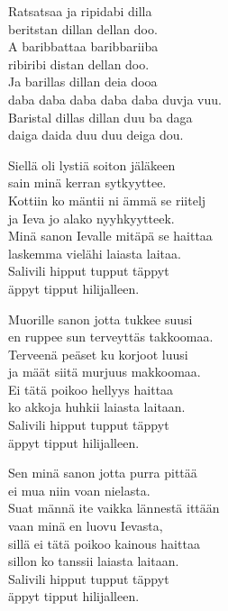Ratsatsaa ja ripidabi dilla\\
beritstan dillan dellan doo.\\
A baribbattaa baribbariiba\\
ribiribi distan dellan doo.\\
Ja barillas dillan deia dooa\\
daba daba daba daba daba duvja vuu.\\
Baristal dillas dillan duu ba daga\\
daiga daida duu duu deiga dou.


Siellä oli lystiä soiton jäläkeen\\
sain minä kerran sytkyyttee.\\
Kottiin ko mäntii ni ämmä se riitelj\\
ja Ieva jo alako nyyhkyytteek.\\
Minä sanon Ievalle mitäpä se haittaa\\
laskemma vielähi laiasta laitaa.\\
Salivili hipput tupput täppyt\\
äppyt tipput hilijalleen.


Muorille sanon jotta tukkee suusi\\
en ruppee sun terveyttäs takkoomaa.\\
Terveenä peäset ku korjoot luusi\\
ja määt siitä murjuus makkoomaa.\\
Ei tätä poikoo hellyys haittaa\\
ko akkoja huhkii laiasta laitaan.\\
Salivili hipput tupput täppyt\\
äppyt tipput hilijalleen.


Sen minä sanon jotta purra pittää\\
ei mua niin voan nielasta.\\
Suat männä ite vaikka lännestä ittään\\
vaan minä en luovu Ievasta,\\
sillä ei tätä poikoo kainous haittaa\\
sillon ko tanssii laiasta laitaan.\\
Salivili hipput tupput täppyt\\
äppyt tipput hilijalleen.